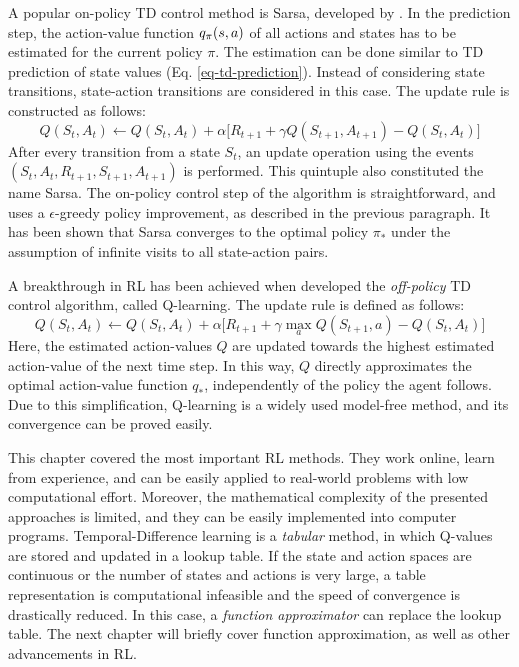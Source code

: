 \documentclass[a4paper, twoside, 12pt]{article}
\let\textcite\shortciteA
\begin{document}
A popular on-policy TD control method is Sarsa, developed by
\textcite{rummery94_q}. In the prediction step, the action-value function
\(q_\pi(s,a)\) of all actions and states has to be estimated for the current
policy \(\pi\). The estimation can be done similar to TD prediction of state
values (Eq. \ref{eq-td-prediction}). Instead of considering state transitions,
state-action transitions are considered in this case. The update rule is
constructed as follows:
\begin{equation}
    Q(S_t, A_t) \leftarrow Q(S_t,A_t) + \alpha\big[R_{t+1}+\gamma Q(S_{t+1},A_{t+1}) - Q(S_t, A_t)\big]
\end{equation}
After every transition from a state \(S_t\), an update operation using the events
\((S_t, A_t, R_{t+1}, S_{t+1}, A_{t+1})\) is performed. This quintuple also
constituted the name Sarsa. The on-policy control step of the algorithm is
straightforward, and uses a \(\epsilon\)-greedy policy improvement, as described in
the previous paragraph. It has been shown that Sarsa converges to the optimal
policy \(\pi_*\) under the assumption of infinite visits to all state-action
pairs.

A breakthrough in RL has been achieved when \textcite{watkins92_q_learn} developed
the \emph{off-policy} TD control algorithm, called Q-learning. The update rule is
defined as follows:
\begin{equation}
    Q(S_t, A_t) \leftarrow Q(S_t,A_t) + \alpha\big[R_{t+1}+\gamma\max_a Q(S_{t+1},a) - Q(S_t, A_t)\big]
\end{equation}
Here, the estimated action-values \(Q\) are updated towards the highest estimated
action-value of the next time step. In this way, \(Q\) directly approximates the
optimal action-value function \(q_*\), independently of the policy the agent
follows. Due to this simplification, Q-learning is a widely used model-free
method, and its convergence can be proved easily.


This chapter covered the most important RL methods. They work online, learn from
experience, and can be easily applied to real-world problems with low
computational effort. Moreover, the mathematical complexity of the presented
approaches is limited, and they can be easily implemented into computer
programs. Temporal-Difference learning is a \emph{tabular} method, in which Q-values
are stored and updated in a lookup table. If the state and action spaces are
continuous or the number of states and actions is very large, a table
representation is computational infeasible and the speed of convergence is
drastically reduced. In this case, a \emph{function approximator} can replace the
lookup table. The next chapter will briefly cover function approximation, as
well as other advancements in RL.
\end{document}

